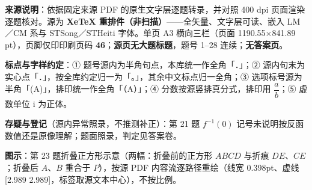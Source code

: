 


\begin{gktip}
\textbf{来源说明}：依据固定来源 PDF 的原生文字层逐题转录，并对照 400 dpi 页面渲染逐题核对。源为 \textbf{XeTeX 重排件（非扫描）}——全矢量、文字层可读、嵌入 LM／CM 系与 STSong／STHeiti 字体。单页 A3 横向三栏（页面 1190.55×841.89 pt），页脚仅印印刷页码 \textbf{46}；\textbf{源页无大题标题}，题号 1–28 连续；\textbf{无答案页}。

\textbf{标点与字样约定}：① 题号源内为半角句点，本库统一作全角「．」；② 源内句末为实心点「．」，按全库约定归一为「。」，其余中文标点归一全角；③ 选项标号源为半角「(A)」，排印统一作全角「（A）」；④ 分数按源竖排真分式，排印用 \(\dfrac{a}{b}\)；⑤ 虚数单位 \(\mathrm{i}\) 为正体。

\textbf{存疑与登记}（源内异常照录，不推测补正）：第 21 题 \(f^{-1}(0)\) 记号未说明按反函数值还是原像理解；题面照录，判定见答案卷。

\textbf{图示}：第 23 题折叠正方形示意（两幅：折叠前的正方形 \(ABCD\) 与折痕 \(DE\)、\(CE\)；折叠后 \(A\)、\(B\) 重合于 \(P\)），按源 PDF 内容流逐路径重绘（线宽 0.398pt、虚线 [2.989 2.989]，标签取源文本中心），不按比例。
\end{gktip}

